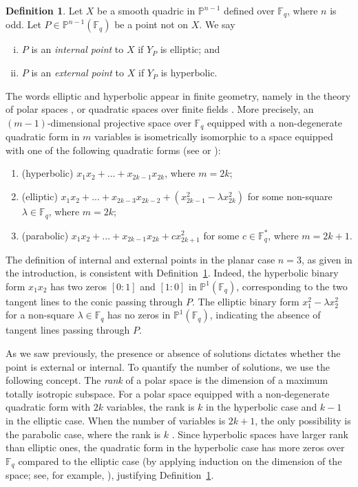 \documentclass[12pt,reqno]{amsart}
\theoremstyle{definition}
\newtheorem{defn}[thm]{Definition}
\newcommand{\F}{\mathbb{F}}
\begin{document}
\begin{defn}\label{def:internal-external} Let $X$ be a smooth quadric in $\mathbb{P}^{n-1}$ defined over $\F_q$, where $n$ is odd. Let $P \in \mathbb{P}^{n-1}(\F_q)$ be a point not on $X$. We say
\begin{enumerate}[(i)]
\item $P$ is an \emph{internal point} to $X$ if $Y_P$ is elliptic; and
\item $P$ is an \emph{external point} to $X$ if $Y_P$ is hyperbolic.
\end{enumerate}
\end{defn}

The words elliptic and hyperbolic appear in finite geometry, namely in the theory of polar spaces \cite[Section 4.2]{B15}, or quadratic spaces over finite fields \cite[Section 2]{Y24}. More precisely, an $(m-1)$-dimensional projective space over $\F_q$ equipped with a non-degenerate quadratic form in $m$ variables is isometrically isomorphic to a space equipped with one of the following quadratic forms (see \cite[Theorem 3.28]{B15} or \cite[equation (1.2)]{Y24}):
\begin{enumerate}
\item (hyperbolic) $x_1 x_2+...+x_{2k-1} x_{2k}$, where $m=2k$;
\item (elliptic) $x_1 x_2+...+x_{2k-3} x_{2k-2}+(x_{2k-1}^2-\lambda x_{2k}^2)$ for some non-square $\lambda\in\F_q$, where $m=2k$;
\item (parabolic) $x_1 x_2+...+x_{2k-1} x_{2k}+c x_{2k+1}^2$ for some $c\in\F_q^*$, where $m=2k+1$.
\end{enumerate}


The definition of internal and external points in the planar case $n=3$, as given in the introduction, is consistent with Definition~\ref{def:internal-external}. Indeed, the hyperbolic binary form $x_1x_2$ has two zeros $[0:1]$ and $[1:0]$ in $\mathbb{P}^{1}(\F_q)$, corresponding to the two tangent lines to the conic passing through $P$. The elliptic binary form $x_1^2-\lambda x_2^2$ for a non-square $\lambda\in\F_q$ has no zeros in $\mathbb{P}^{1}(\F_q)$, indicating the absence of tangent lines passing through $P$.

As we saw previously, the presence or absence of solutions dictates whether the point is external or internal. To quantify the number of solutions, we use the following concept. The \emph{rank} of a polar space is the dimension of a maximum totally isotropic subspace. For a polar space equipped with a non-degenerate quadratic form with $2k$ variables, the rank is $k$ in the hyperbolic case and $k-1$ in the elliptic case. When the number of variables is $2k + 1$, the only possibility is the parabolic case, where the rank is $k$ \cite[Table 4.1]{B15}. Since hyperbolic spaces have larger rank than elliptic ones, the quadratic form in the hyperbolic case has more zeros over $\F_q$ compared to the elliptic case (by applying induction on the dimension of the space; see, for example, \cite{P51}), justifying Definition~\ref{def:internal-external}. 
\end{document}
